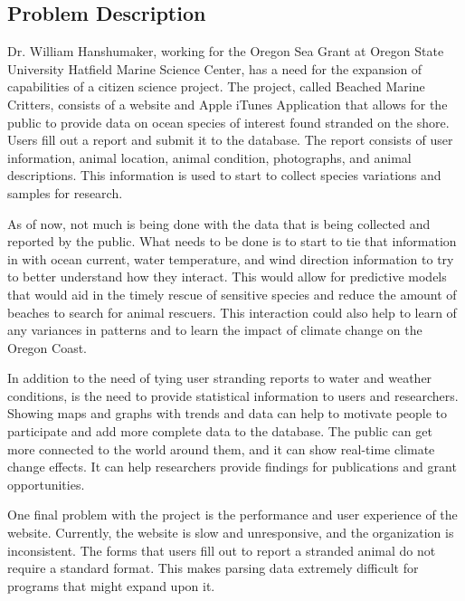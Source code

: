 \documentclass[onecolumn, draftclsnofoot,10pt, compsoc]{IEEEtran}
\begin{document}
\begin{singlespace}
\section{Problem Description}
			Dr. William Hanshumaker, working for the Oregon Sea Grant at Oregon State University Hatfield Marine Science Center, has a need for the expansion of 
			capabilities of a citizen science project.  The project, called Beached Marine Critters, consists of a website and Apple iTunes Application that allows
			for the public to provide data on ocean species of interest found stranded on the shore.  Users fill out a report and submit it to the database.
		  The report consists of user information, animal location, animal condition, photographs, and animal descriptions.  This information is used to 
		start to collect species variations and samples for research.  
		
		As of now, not much is being done with the data that is being collected and reported by the public.  What needs to be done is to start to tie that information in 
		with ocean current, water temperature, and wind direction information to try to better understand how they interact.  This would allow for predictive models
		that would aid in the timely rescue of sensitive species and reduce the amount of beaches to search for animal rescuers.  This interaction could also
		help to learn of any variances in patterns and to learn the impact of climate change on the Oregon Coast.  

		In addition to the need of tying user stranding reports to water and weather conditions, is the need to provide statistical information to users and researchers.
		Showing maps and graphs with trends and data can help to motivate people to participate and add more complete data to the database.  The public can get more
		connected to the world around them, and it can show real-time climate change effects.  It can help researchers provide findings for publications and grant opportunities.

		One final problem with the project is the performance and user experience of the website.  Currently, the website is slow and unresponsive, and the organization is
		inconsistent.  The forms that users fill out to report a stranded animal do not require a standard format.  This makes parsing data extremely difficult for programs that
		might expand upon it.


\end{singlespace}
\end{document}
